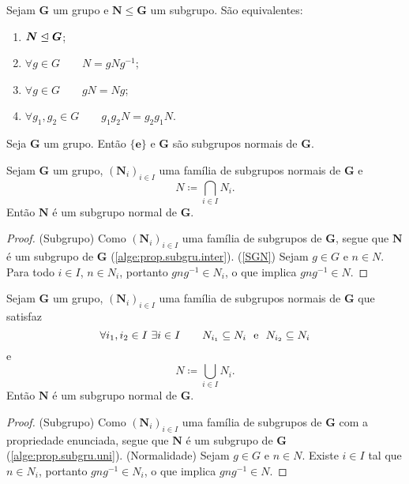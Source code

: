 \begin{prop}
Sejam $\bm G$ um grupo e $\bm N \leq \bm G$ um subgrupo. São equivalentes:
	\begin{enumerate}
	\item $\bm N \mathrel{\unlhd} \bm G$;
	\item $\forall g \in G \qquad N=gNg^{-1}$;
	\item $\forall g \in G \qquad gN=Ng$;
	\item $\forall g_1,g_2 \in G \qquad g_1g_2N = g_2g_1N$.
	\end{enumerate}
\end{prop}

\begin{prop}
\label{alge:prop.subgrunor.triv}
Seja $\bm G$ um grupo. Então $\bm{\{e\}}$ e $\bm G$ são subgrupos normais de $\bm G$.
\end{prop}

\begin{prop}
\label{alge:prop.subgrunor.inter}
Sejam $\bm G$ um grupo, $(\bm N_i)_{i \in I}$ uma família de subgrupos normais de $\bm G$ e
	\begin{equation*}
	N \coloneqq \bigcap_{i \in I} N_i.
	\end{equation*}
Então $\bm N$ é um subgrupo normal de $\bm G$.
\end{prop}
\begin{proof}
(Subgrupo) Como $(\bm N_i)_{i \in I}$ uma família de subgrupos de $\bm G$, segue que $\bm N$ é um subgrupo de $\bm G$ (\ref{alge:prop.subgru.inter}).
(\ref{SGN}) Sejam $g \in G$ e $n \in N$. Para todo $i \in I$, $n \in N_i$, portanto $gng^{-1} \in N_i$, o que implica $gng^{-1} \in N$.
\end{proof}

\begin{conj}
\label{alge:prop.subgrunor.uni}
Sejam $\bm G$ um grupo, $(\bm N_i)_{i \in I}$ uma família de subgrupos normais de $\bm G$ que satisfaz
	\begin{equation*}
	\forall i_1,i_2 \in I\ \exists i \in I \qquad N_{i_1} \subseteq N_{i} \text{\ \ e\ \ } N_{i_2} \subseteq N_{i}
	\end{equation*}
e
	\begin{equation*}
	N \coloneqq \bigcup_{i \in I} N_i.
	\end{equation*}
Então $\bm N$ é um subgrupo normal de $\bm G$.
\end{conj}
\begin{proof}
(Subgrupo) Como $(\bm N_i)_{i \in I}$ uma família de subgrupos de $\bm G$ com a propriedade enunciada, segue que $\bm N$ é um subgrupo de $\bm G$ (\ref{alge:prop.subgru.uni}).
(Normalidade) Sejam $g \in G$ e $n \in N$. Existe $i \in I$ tal que $n \in N_i$, portanto $gng^{-1} \in N_i$, o que implica $gng^{-1} \in N$.
\end{proof}

